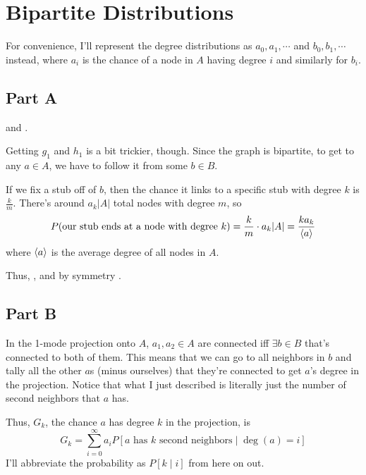 \documentclass[12pt]{article}
\begin{document}
\section{Bipartite Distributions}

For convenience, I'll represent the degree distributions as
$a_0, a_1, \cdots$ and $b_0, b_1, \cdots$ instead, where $a_i$ is the chance
of a node in $A$ having degree $i$ and similarly for $b_i$.

\subsection{Part A}

 and
.

Getting $g_1$ and $h_1$ is a bit trickier, though.
Since the graph is bipartite, to get to any $a \in A$, we have to follow it from some $b \in B$.

If we fix a stub off of $b$, then the chance it links to a specific stub
with degree $k$ is $\frac{k}{m}$.
There's around $a_k|A|$ total nodes with degree $m$, so
\[P(\text{our stub ends at a node with degree $k$})=\frac{k}{m} \cdot a_k|A| = \frac{ka_k}{\braket{a}}\]
where $\braket{a}$ is the average degree of all nodes in $A$.

Thus, ,
and by symmetry .

\subsection{Part B}

In the 1-mode projection onto $A$, $a_1, a_2 \in A$ are connected iff $\exists b \in B$
that's connected to both of them.
This means that we can go to all neighbors in $b$ and tally all the other $a$s
(minus ourselves) that they're connected to get $a$'s degree in the projection.
Notice that what I just described is literally just the number of second neighbors
that $a$ has.

Thus, $G_k$, the chance $a$ has degree $k$ in the projection, is
\[G_k = \sum_{i=0}^{\infty} a_i P[\text{$a$ has $k$ second neighbors} \mid \deg(a)=i]\]
I'll abbreviate the probability as $P[k \mid i]$ from here on out.
\end{document}
